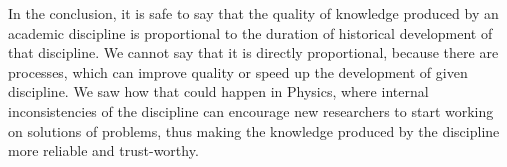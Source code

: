 \documentclass[12pt,a4paper]{article}
\begin{document}
In the conclusion, it is safe to say that the quality of knowledge produced by an academic discipline is proportional to the duration of historical development of that discipline. We cannot say that it is directly proportional, because there are processes, which can improve quality or speed up the development of given discipline. We saw how that could happen in Physics, where internal inconsistencies of the discipline can encourage new researchers to start working on solutions of problems, thus making the knowledge produced by the discipline more reliable and trust-worthy. \\

\singlespacing
\newpage


\end{document}
